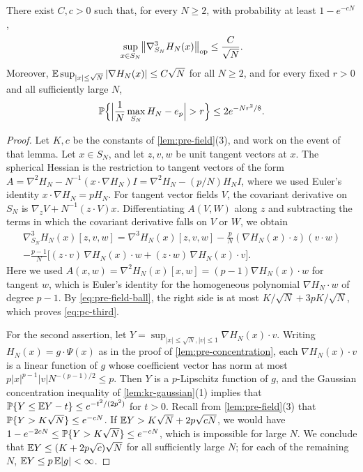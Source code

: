 \begin{lemma}\label{lem:pc-regularity}
There exist $C,c>0$ such that, for every $N\ge2$, with probability at least $1-e^{-cN}$,
\begin{equation}\label{eq:pc-third}
\sup_{x\in S_N}\bigl\|\nabla^3_{S_N}H_N(x)\bigr\|_{\rm op}\le\frac C{\sqrt N}.
\end{equation}
Moreover, $\mathbb E\sup_{|x|\le\sqrt N}|\nabla H_N(x)|\le C\sqrt N$ for all $N\ge2$, and for every fixed $r>0$ and all sufficiently large $N$,
\begin{equation}\label{eq:pc-ground-conc}
\Pp\Bigl\{\Bigl|\frac1N\max_{S_N}H_N-e_p\Bigr|>r\Bigr\}\le2e^{-Nr^2/8}.
\end{equation}
\end{lemma}

\begin{proof}
Let $K,c$ be the constants of \cref{lem:pre-field}(3), and work on the event of that lemma. Let $x\in S_N$, and let $z,v,w$ be unit tangent vectors at $x$. The spherical Hessian is the restriction to tangent vectors of the form $A=\nabla^2H_N-N^{-1}(x\cdot\nabla H_N)I=\nabla^2H_N-(p/N)H_NI$, where we used Euler's identity $x\cdot\nabla H_N=pH_N$. For tangent vector fields $V$, the covariant derivative on $S_N$ is $\nabla_zV+N^{-1}(z\cdot V)x$. Differentiating $A(V,W)$ along $z$ and subtracting the terms in which the covariant derivative falls on $V$ or $W$, we obtain
\begin{multline*}
\nabla^3_{S_N}H_N(x)[z,v,w]=\nabla^3H_N(x)[z,v,w]-\frac pN(\nabla H_N(x)\cdot z)(v\cdot w)\\
-\frac{p-1}N\bigl[(z\cdot v)\,\nabla H_N(x)\cdot w+(z\cdot w)\,\nabla H_N(x)\cdot v\bigr].
\end{multline*}
Here we used $A(x,w)=\nabla^2H_N(x)[x,w]=(p-1)\nabla H_N(x)\cdot w$ for tangent $w$, which is Euler's identity for the homogeneous polynomial $\nabla H_N\cdot w$ of degree $p-1$. By \eqref{eq:pre-field-ball}, the right side is at most $K/\sqrt N+3pK/\sqrt N$, which proves \eqref{eq:pc-third}.

For the second assertion, let $Y=\sup_{|x|\le\sqrt N,|v|\le1}\nabla H_N(x)\cdot v$. Writing $H_N(x)=g\cdot\Psi(x)$ as in the proof of \cref{lem:pre-concentration}, each $\nabla H_N(x)\cdot v$ is a linear function of $g$ whose coefficient vector has norm at most $p|x|^{p-1}|v|N^{-(p-1)/2}\le p$. Then $Y$ is a $p$-Lipschitz function of $g$, and the Gaussian concentration inequality of \cref{lem:kr-gaussian}(1) implies that $\mathbb P\{Y\le\mathbb E Y-t\}\le e^{-t^2/(2p^2)}$ for $t>0$. Recall from \cref{lem:pre-field}(3) that $\mathbb P\{Y>K\sqrt N\}\le e^{-cN}$. If $\mathbb E Y>K\sqrt N+2p\sqrt{cN}$, we would have $1-e^{-2cN}\le\mathbb P\{Y>K\sqrt N\}\le e^{-cN}$, which is impossible for large $N$. We conclude that $\mathbb E Y\le(K+2p\sqrt c)\sqrt N$ for all sufficiently large $N$; for each of the remaining $N$, $\mathbb E Y\le p\,\mathbb E|g|<\infty$.


\end{proof}

